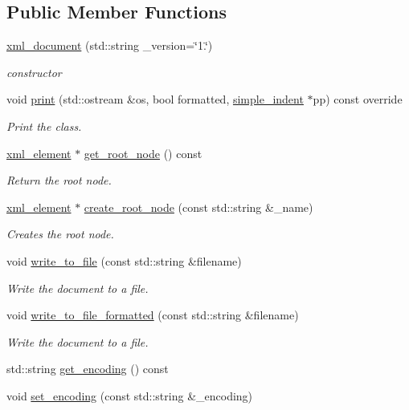 \subsection*{Public Member Functions}
\begin{DoxyCompactItemize}
\item 
\hyperlink{classxml__document_a03cf3e32f87176a60732913df5bd5c96}{xml\+\_\+document} (std\+::string \+\_\+version=\char`\"{}1.\char`\"{})
\begin{DoxyCompactList}\small\item\em constructor \end{DoxyCompactList}\item 
void \hyperlink{classxml__document_ac55f82f4aac49a623187eb872a164af9}{print} (std\+::ostream \&os, bool formatted, \hyperlink{classsimple__indent}{simple\+\_\+indent} $\ast$pp) const override
\begin{DoxyCompactList}\small\item\em Print the class. \end{DoxyCompactList}\item 
\hyperlink{classxml__element}{xml\+\_\+element} $\ast$ \hyperlink{classxml__document_a443e21b9032761fc7392cf914aa7f5a6}{get\+\_\+root\+\_\+node} () const
\begin{DoxyCompactList}\small\item\em Return the root node. \end{DoxyCompactList}\item 
\hyperlink{classxml__element}{xml\+\_\+element} $\ast$ \hyperlink{classxml__document_affb3c5eca511533f87419fdcd4539cc7}{create\+\_\+root\+\_\+node} (const std\+::string \&\+\_\+name)
\begin{DoxyCompactList}\small\item\em Creates the root node. \end{DoxyCompactList}\item 
void \hyperlink{classxml__document_a82df368faa79a46d8f4b9e635b5bcfac}{write\+\_\+to\+\_\+file} (const std\+::string \&filename)
\begin{DoxyCompactList}\small\item\em Write the document to a file. \end{DoxyCompactList}\item 
void \hyperlink{classxml__document_a9dd04cd3a1d5157886388a17134bafa1}{write\+\_\+to\+\_\+file\+\_\+formatted} (const std\+::string \&filename)
\begin{DoxyCompactList}\small\item\em Write the document to a file. \end{DoxyCompactList}\item 
std\+::string \hyperlink{classxml__document_add2110c6e02cc44713278c07811cb07d}{get\+\_\+encoding} () const
\item 
void \hyperlink{classxml__document_a9542af1b1e91bdbde492ff3213fadef3}{set\+\_\+encoding} (const std\+::string \&\+\_\+encoding)
\end{DoxyCompactItemize}
